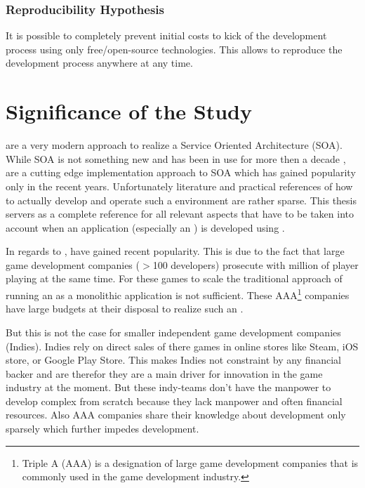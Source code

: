 \subsubsection{Reproducibility Hypothesis} 
It is possible to completely prevent initial costs to kick of the development
process using only free/open-source technologies. This allows to reproduce the
development process anywhere at any time.

\section{Significance of the Study}

\mss{} are a very modern approach to realize a Service Oriented Architecture
(SOA). While SOA is not something new and has been in use for more then a decade
\cite{josuttis2007soa}, \mss{} are a cutting edge implementation approach to SOA
which has gained popularity only in the recent years\cite{rajeev2016ms_popular}.
Unfortunately literature and practical references of how to actually develop and
operate such a \ms{} environment are rather sparse. This thesis servers as a
complete reference for all relevant aspects that have to be taken into account
when an application (especially an \og{}) is developed using \mss{}.

In regards to \ogs{}, \mss{} have gained recent popularity. This is due to the
fact that large game development companies ($>$100 developers) prosecute \ogs{}
with million of player playing at the same time\cite{pronschinske2015turbine}.
For these games to scale the traditional approach of running an \og{} as a
monolithic application is not sufficient. These AAA\footnote{Triple A (AAA) is
a designation of large game development companies that is commonly used in the
game development industry.} companies have large budgets at their disposal to
realize such an \og{}.

But this is not the case for smaller independent game development companies
(Indies). Indies rely on direct sales of there games in online stores like
Steam, iOS store, or Google Play Store. This makes Indies not constraint by any
financial backer and are therefor they are a main driver for innovation in the
game industry at the moment. But these indy-teams don't have the manpower to
develop complex \ogs{} from scratch because they lack manpower and often
financial resources. Also AAA companies share their knowledge about \og{}
development only sparsely which further impedes \og{} development.

